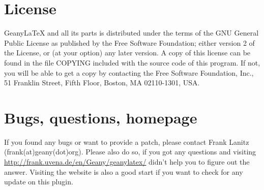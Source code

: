 \documentclass[%
paper=a4,%
fontsize=11pt,%
twoside=false,%
DIV18,%
headsepline,%
plainheadsepline,%
footsepline,%
plainfootsepline,%
bibliography=totoc,%
listof=totoc,%
BCOR10mm,%
parskip=half,%
openany,%
]{scrartcl}
\begin{document}
\section{License}
Geany\LaTeX{} and all its parts is distributed under the terms of the
GNU General Public License as published by the Free Software
Foundation; either version 2 of the License, or (at your option) any
later version. A copy of this license can be found in the file COPYING
included with the source code of this program. If not, you will be
able to get a copy by contacting the Free Software Foundation, Inc.,
51 Franklin Street, Fifth Floor, Boston, MA 02110-1301, USA.


\section{Bugs, questions, homepage}
\label{contact}
If you found any bugs or want to provide a patch, please contact Frank
Lanitz (frank(at)geany(dot)org). Please also do so, if you got any
questions and visiting \\ \url{http://frank.uvena.de/en/Geany/geanylatex/}
didn't help you to figure out the answer. Visiting the website is also
a good start if you want to check for any update on this plugin.
\end{document}
